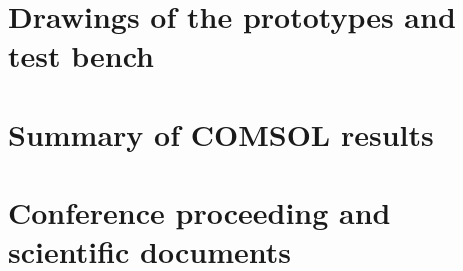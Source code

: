 \chapter{Drawings of the prototypes and test bench}








\chapter{Summary of COMSOL results}



\chapter{Conference proceeding and scientific documents}



